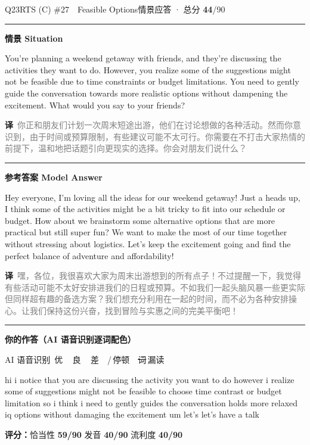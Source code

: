 \documentclass[11pt]{article}
\newcommand{\spart}[1]{\textcolor{cPartial}{\bfseries #1}} %
\newcommand{\ptesub}[1]{%
  \par\needspace{2\baselineskip}\smallskip
  {\color{cAccent}\rule[-0.2ex]{3pt}{1.05em}}\hspace{6pt}%
  {\bfseries\color{cHead}#1}\par\nopagebreak\smallskip}
\newcommand{\sg}[1]{\textcolor{cSpkGood}{#1}}   %
\newcommand{\sy}[1]{\textcolor{cSpkOk}{#1}}     %
\newcommand{\sr}[1]{\textcolor{cSpkBad}{#1}}    %
\newcommand{\asrlegend}{{\footnotesize\color{gray}AI 语音识别\quad
  {\color{cSpkGood}\textbullet}\,优\ \ {\color{cSpkOk}\textbullet}\,良\ \
  {\color{cSpkBad}\textbullet}\,差\ \ {\color{gray}/}\,停顿\ \
  {\color{cSpkBad}\sout{词}}\,漏读}}
\newcommand{\zh}[1]{{\footnotesize\textcolor{cNote}{\textbf{译}}\ \textcolor{gray}{#1}}}
\begin{document}
\begin{qblock}{Q23\quad RTS (C) \#27\ \ Feasible Options}{情景应答 · 总分 \textcolor{cAccent}{\bfseries 44}/90}
\ptesub{情景 Situation}
\begin{promptbox}
You're planning a weekend getaway with friends, and they're discussing the activities they want to do. However, you realize some of the suggestions might not be feasible due to time constraints or budget limitations. You need to gently guide the conversation towards more realistic options without dampening the excitement. What would you say to your friends?
\end{promptbox}
\zh{你正和朋友们计划一次周末短途出游，他们在讨论想做的各种活动。然而你意识到，由于时间或预算限制，有些建议可能不太可行。你需要在不打击大家热情的前提下，温和地把话题引向更现实的选择。你会对朋友们说什么？}
\ptesub{参考答案 Model Answer}
\begin{modelbox}
Hey everyone, I'm loving all the ideas for our weekend getaway! Just a heads up, I think some of the activities might be a bit tricky to fit into our schedule or budget. How about we brainstorm some alternative options that are more practical but still super fun? We want to make the most of our time together without stressing about logistics. Let's keep the excitement going and find the perfect balance of adventure and affordability!
\end{modelbox}
\zh{嘿，各位，我很喜欢大家为周末出游想到的所有点子！不过提醒一下，我觉得有些活动可能不太好安排进我们的日程或预算。不如我们一起头脑风暴一些更实际但同样超有趣的备选方案？我们想充分利用在一起的时间，而不必为各种安排操心。让我们保持这份兴奋，找到冒险与实惠之间的完美平衡吧！}
\ptesub{你的作答（AI 语音识别逐词配色）}
\asrlegend
\begin{asrbox}
\sy{hi} \sg{i} \sg{notice} \sy{that} \sg{you} \sg{are} \sg{discussing} \sy{the} \sg{activity} \sy{you} \sg{want} \sg{to} \sg{do} \sg{however} \sg{i} \sy{realize} \sg{some} \sg{of} \sg{suggestions} \sg{might} \sr{not} \sg{be} \sg{feasible} \sg{to} \sg{choose} \sg{time} \sg{contrast} \sg{or} \sg{budget} \sg{limitation} \sg{so} \sg{i} \sg{think} \sg{i} \sg{need} \sg{to} \sg{gently} \sy{guides} \sg{the} \sg{conversation} \sr{holds} \sg{more} \sg{relaxed} \sr{iq} \sg{options} \sg{without} \sr{damaging} \sg{the} \sg{excitement} \sg{um} \sg{let's} \sg{let's} \sg{have} \sg{a} \sg{talk}
\end{asrbox}
\smallskip
{\small\textbf{评分：}恰当性 \spart{59/90} \quad\textperiodcentered\quad 发音 \spart{40/90} \quad\textperiodcentered\quad 流利度 \spart{40/90}}
\end{qblock}
\end{document}
